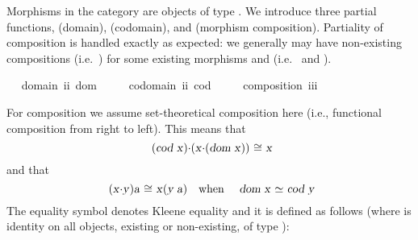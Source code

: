 \begin{isabellebody}
\begin{isamarkuptext}
Morphisms in the category are objects of type . We introduce three partial functions, 
 (domain),  (codomain), and \isa{{\isasymcdot}} (morphism composition). 
Partiality of composition is handled exactly as expected: we generally may have non-existing compositions 
(i.e.~) for some existing  morphisms  and  (i.e.~
 and ).%
\end{isamarkuptext}\isamarkuptrue%
\isamarkupfalse%
\ \isanewline
\ domain{\isacharcolon}{\isacharcolon}\ {\isachardoublequoteopen}i{\isasymRightarrow}i{\isachardoublequoteclose}\ {\isacharparenleft}{\isachardoublequoteopen}dom\ {\isacharunderscore}{\isachardoublequoteclose}\ {\isacharbrackleft}{}{}{}{\isacharbrackright}\ {}{}{}{\isacharparenright}\ \isanewline
\ codomain{\isacharcolon}{\isacharcolon}\ {\isachardoublequoteopen}i{\isasymRightarrow}i{\isachardoublequoteclose}\ {\isacharparenleft}{\isachardoublequoteopen}cod\ {\isacharunderscore}{\isachardoublequoteclose}\ {\isacharbrackleft}{}{}{}{\isacharbrackright}\ {}{}{}{\isacharparenright}\ \isanewline
\ composition{\isacharcolon}{\isacharcolon}\ {\isachardoublequoteopen}i{\isasymRightarrow}i{\isasymRightarrow}i{\isachardoublequoteclose}\ {\isacharparenleft}\ {\isachardoublequoteopen}{\isasymcdot}{\isachardoublequoteclose}\ {}{}{}{\isacharparenright}%
\begin{isamarkuptext}%
For composition \isa{{\isasymcdot}} we assume set-theoretical composition here (i.e., functional 
composition from right to left). This means that
\[\isa{{\isacharparenleft}cod\ x{\isacharparenright}{\isasymcdot}{\isacharparenleft}x{\isasymcdot}{\isacharparenleft}dom\ x{\isacharparenright}{\isacharparenright}\ {\isasymcong}\ x}\] and that \[\isa{{\isacharparenleft}x{\isasymcdot}y{\isacharparenright}a\ {\isasymcong}\ x{\isacharparenleft}y\ a{\isacharparenright}}\quad \text{when}\quad
\isa{dom\ x\ {\isasymsimeq}\ cod\ y}\] 
The equality symbol \isa{{\isasymcong}} denotes Kleene equality and it
is defined as follows (where \isa{{\isacharequal}} is identity on all objects, existing or non-existing, 
of type ):%
\end{isamarkuptext}\isamarkuptrue%
\isamarkupfalse%

\end{isabellebody}
